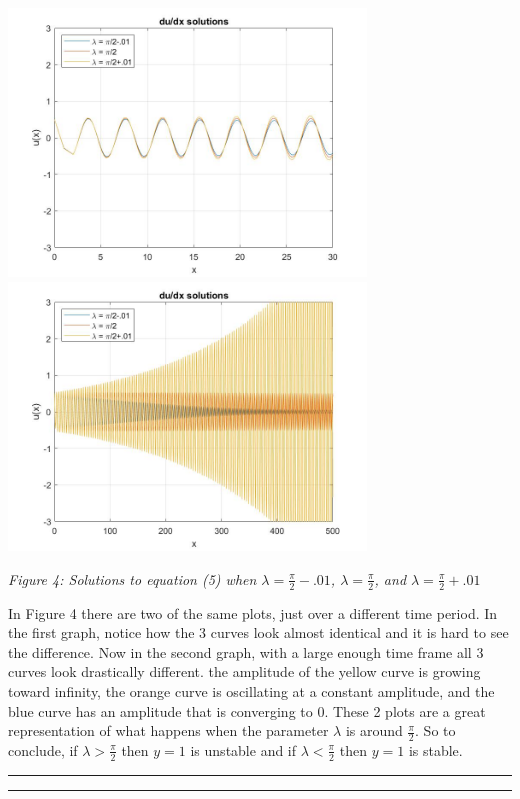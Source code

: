 \documentclass{article}
\begin{document}
\bigskip
\begin{center}
    \includegraphics[width=9.5cm]{du_close1.jpg}\includegraphics[width=9.5cm]{du_close2.jpg}
    
    \textit{Figure 4: Solutions to equation (5) when $\lambda = \frac{\pi}{2}-.01$, $\lambda = \frac{\pi}{2}$, and $\lambda = \frac{\pi}{2}+.01$}
    
\end{center}
In Figure 4 there are two of the same plots, just over a different time period. In the first graph, notice how the 3 curves look almost identical and it is hard to see the difference. Now in the second graph, with a large enough time frame all 3 curves look drastically different. the amplitude of the yellow curve is growing toward infinity, the orange curve is oscillating at a constant amplitude, and the blue curve has an amplitude that is converging to $0$. These 2 plots are a great representation of what happens when the parameter $\lambda$ is around $\frac{\pi}{2}$. So to conclude, if $\lambda > \frac{\pi}{2}$ then $y=1$ is unstable and if $\lambda < \frac{\pi}{2}$ then $y=1$ is stable. 


\bigskip
\hrule\hrule
\medskip
\end{document}
